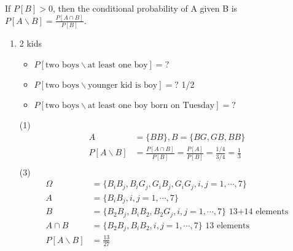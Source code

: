 \begin{definition}[]{}
If $ P[B]>0 $, then the conditional probability of A given B is $ P[A\backslash B]=\frac{P[A\cap B]}{P[B]} $.
\end{definition}
\begin{example}[]{}
 \begin{enumerate}[label=\circled{\arabic*}] 
 \item 2 kids \begin{itemize}
 \item $ P[\text{two boys}\backslash\text{at least one boy}]=? $ 
 \item $ P[\text{two boys}\backslash\text{younger kid is boy}]=? $ 1/2
 \item $ P[\text{two boys}\backslash\text{at least one boy born on Tuesday}]=? $
 \end{itemize}
 (1)
 \begin{align*}{}{}
 A&=\{BB\},B=\{BG,GB,BB\}\\
P[A\backslash B]&=\frac{P[A\cap B]}{P[B]}=\frac{P[A]}{P[B]}=\frac{1/4}{3/4}=\frac{1}{3}\\
 \end{align*}
 (3)
 \begin{align*}{}{}
 \Omega&=\{B_iB_j,B_iG_j,G_iB_j,G_iG_j,i,j=1,\cdots,7\}\\
 A&=\{B_iB_j,i,j=1,\cdots,7\}\\
 B&=\{B_2B_j,B_iB_2,B_2G_j,i,j=1,\cdots,7\} \text{ 13+14 elements}\\
 A\cap B&=\{B_2B_j,B_iB_2,i,j=1,\cdots,7\} \text{ 13 elements}\\
    P[A\backslash B]&=\frac{13}{27}
 \end{align*}
 \end{enumerate}
\end{example}
